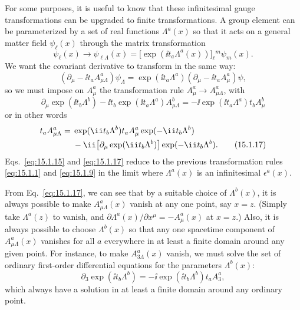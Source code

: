For some purposes, it is useful to know that these infinitesimal gauge
transformations can be upgraded to finite transformations. A group element can
be parameterized by a set of real functions $\Lambda^a(x)$ so that it acts
on a general matter field $\psi_\ell(x)$ through the matrix transformation
\begin{equation}
 \psi_\ell(x)\longrightarrow\psi_{\ell\Lambda}(x)
 =\bigl[\exp(\ii t_a\Lambda^a(x))\bigr]_\ell{}^m\psi_m(x) .
 \tag{15.1.15}\label{eq:15.1.15}
\end{equation}
We want the covariant derivative to transform in the same way:
\begin{equation}
 (\partial_\mu-\ii t_a A^a_{\mu\Lambda})\psi_\Lambda
 =\exp(\ii t_a\Lambda^a)(\partial_\mu-\ii t_a A^a_\mu)\psi ,
 \tag{15.1.16}\label{eq:15.1.16}
\end{equation}
so we must impose on $A^a_\mu$ the transformation rule
$A^a_\mu\longrightarrow A^a_{\mu\Lambda}$, with
\[
 \partial_\mu\exp(\ii t_b\Lambda^b)
 -\ii t_b\exp(\ii t_a\Lambda^a)A^b_{\mu\Lambda}
 =-\ii\exp(\ii t_a\Lambda^a)t_b A^b_\mu
\]
or in other words
\begin{align}
 t_a A^a_{\mu\Lambda}={}&
 \exp(\ii t_b\Lambda^b)t_a A^a_\mu
 \exp(-\ii t_b\Lambda^b)\notag\\
 &{}-\ii\bigl[\partial_\mu\exp(\ii t_b\Lambda^b)\bigr]
 \exp(-\ii t_b\Lambda^b) .
 \tag{15.1.17}\label{eq:15.1.17}
\end{align}
Eqs.~\eqref{eq:15.1.15} and \eqref{eq:15.1.17} reduce to the previous
transformation rules \eqref{eq:15.1.1} and \eqref{eq:15.1.9} in the limit where
$\Lambda^a(x)$ is an infinitesimal $\epsilon^a(x)$.

From Eq.~\eqref{eq:15.1.17}, we can see that by a suitable choice of
$\Lambda^b(x)$, it is always possible to make $A^a_{\mu\Lambda}(x)$
vanish at any one point, say $x=z$. (Simply take $\Lambda^a(z)$ to vanish,
and $\partial\Lambda^a(x)/\partial x^\mu=-A^a_\mu(x)$ at $x=z$.)
Also, it is always possible to choose $\Lambda^b(x)$ so that any one
spacetime component of $A^a_{\mu\Lambda}(x)$ vanishes for all $a$
everywhere in at least a finite domain around any given point. For instance, to
make $A^a_{3\Lambda}(x)$ vanish, we must solve the set of ordinary
first-order differential equations for the parameters $\Lambda^b(x)$:
\begin{equation}
 \partial_3\exp(\ii t_b\Lambda^b)
 =-\ii\exp(\ii t_b\Lambda^b)t_a A^a_3 ,
 \tag{15.1.18}\label{eq:15.1.18}
\end{equation}
which always have a solution in at least a finite domain around any ordinary
point.


